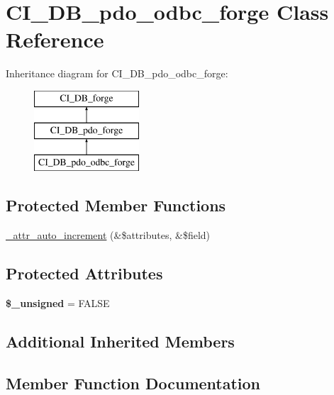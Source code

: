 \hypertarget{class_c_i___d_b__pdo__odbc__forge}{}\section{C\+I\+\_\+\+D\+B\+\_\+pdo\+\_\+odbc\+\_\+forge Class Reference}
\label{class_c_i___d_b__pdo__odbc__forge}
Inheritance diagram for C\+I\+\_\+\+D\+B\+\_\+pdo\+\_\+odbc\+\_\+forge\+:\begin{figure}[H]
\begin{center}
\leavevmode
\includegraphics[height=3.000000cm]{class_c_i___d_b__pdo__odbc__forge}
\end{center}
\end{figure}
\subsection*{Protected Member Functions}
\begin{DoxyCompactItemize}
\item 
\mbox{\hyperlink{class_c_i___d_b__pdo__odbc__forge_ade229abf447aa0e69e7366182e3d8fff}{\+\_\+attr\+\_\+auto\+\_\+increment}} (\&\$attributes, \&\$field)
\end{DoxyCompactItemize}
\subsection*{Protected Attributes}
\begin{DoxyCompactItemize}
\item 
\mbox{\label{class_c_i___d_b__pdo__odbc__forge_ae18bddd6f400444af382fd2a8ebd7f95}} 
{\bfseries \$\+\_\+unsigned} = F\+A\+L\+SE
\end{DoxyCompactItemize}
\subsection*{Additional Inherited Members}


\subsection{Member Function Documentation}
\mbox{\label{class_c_i___d_b__pdo__odbc__forge_ade229abf447aa0e69e7366182e3d8fff}} 

